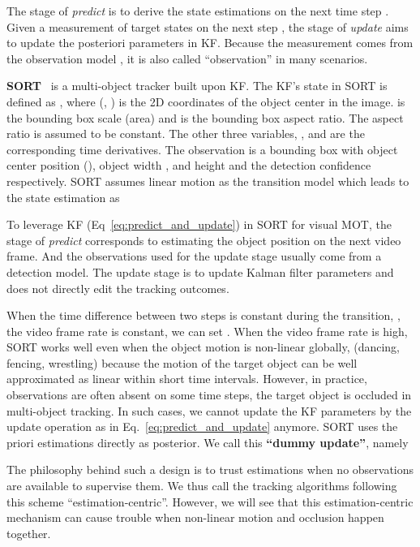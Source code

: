 \documentclass[10pt,twocolumn,letterpaper]{article}
\begin{document}
The stage of \textit{predict} is to derive the state estimations on the next time step . Given a measurement of target states on the next step , the stage of \textit{update} aims to update the posteriori parameters in KF. Because the measurement comes from the observation model , it is also called ``observation'' in many scenarios.

\noindent\textbf{SORT}~\cite{bewley2016simple} is a multi-object tracker built upon KF. The KF's state  in SORT is defined as  ,
where (, ) is the 2D coordinates of the object center in the image.  is the bounding box scale (area) and  is the bounding box aspect ratio. The aspect ratio  is assumed to be constant. The other three variables, ,  and  are the corresponding time derivatives. The observation is a bounding box  with object center position (), object width , and height  and the detection confidence  respectively. SORT assumes linear motion as the transition model  which leads to the state estimation as


To leverage KF (Eq~\ref{eq:predict_and_update}) in SORT for visual MOT, the stage of \textit{predict} corresponds to estimating the object position on the next video frame. And the observations used for the update stage usually come from a detection model. The update stage is to update Kalman filter parameters and does not directly edit the tracking outcomes.

When the time difference between two steps is constant during the transition, \eg, the video frame rate is constant, we can set . 
When the video frame rate is high, SORT works well even when the object motion is non-linear globally, (\eg dancing, fencing, wrestling) because the motion of the target object can be well approximated as linear within short time intervals. However, in practice, observations are often absent on some time steps, \eg the target object is occluded in multi-object tracking. In such cases, we cannot update the KF parameters by the update operation as in Eq.~\ref{eq:predict_and_update} anymore. SORT uses the priori estimations directly as posterior. We call this \textbf{``dummy update''}, namely 


The philosophy behind such a design is to trust estimations when no observations are available to supervise them. We thus call the tracking algorithms following this scheme ``estimation-centric''. However, we will see that this estimation-centric mechanism can cause trouble when non-linear motion and occlusion happen together.
\end{document}
